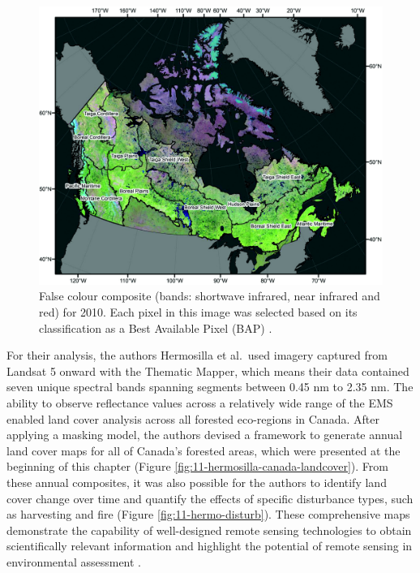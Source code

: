 \documentclass[
]{book}
\begin{document}
\begin{figure}
\includegraphics[width=0.75\linewidth]{images/11-hermosilla-false-colour} \caption{False colour composite (bands: shortwave infrared, near infrared and red) for 2010. Each pixel in this image was selected based on its classification as a Best Available Pixel (BAP) \citep{hermosilla_disturbance-informed_2018}.}\label{fig:11-hermo-false}
\end{figure}

For their analysis, the authors Hermosilla et al.~used imagery captured from Landsat 5 onward with the Thematic Mapper, which means their data contained seven unique spectral bands spanning segments between 0.45 nm to 2.35 nm. The ability to observe reflectance values across a relatively wide range of the EMS enabled land cover analysis across all forested eco-regions in Canada. After applying a masking model, the authors devised a framework to generate annual land cover maps for all of Canada's forested areas, which were presented at the beginning of this chapter (Figure \ref{fig:11-hermosilla-canada-landcover}). From these annual composites, it was also possible for the authors to identify land cover change over time and quantify the effects of specific disturbance types, such as harvesting and fire (Figure \ref{fig:11-hermo-disturb}). These comprehensive maps demonstrate the capability of well-designed remote sensing technologies to obtain scientifically relevant information and highlight the potential of remote sensing in environmental assessment \citep{hermosilla_disturbance-informed_2018}.
\end{document}
